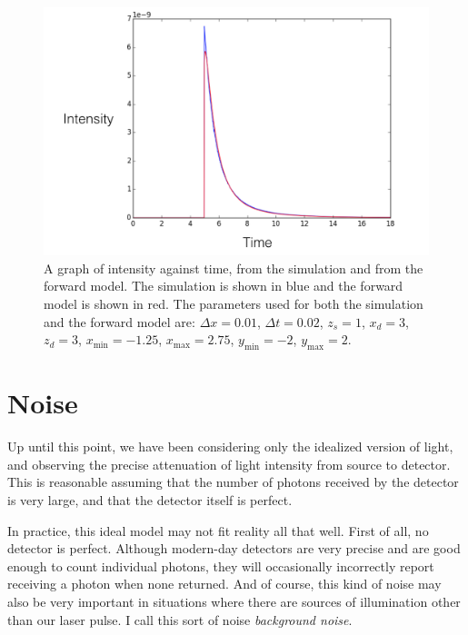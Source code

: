 \documentclass[11pt]{article}
\begin{document}
\begin{figure}
\begin{center}
\centering
\includegraphics[scale=0.5]{figs/simresult.png}
\caption{A graph of intensity against time, from the simulation and from the forward model. The simulation is shown in blue and the forward model is shown in red. The parameters used for both the simulation and the forward model are: $\Delta x = 0.01$, $\Delta t = 0.02$, $z_s = 1$, $x_d = 3$, $z_d = 3$, $x_{\mathrm{min}} = -1.25$, $x_\mathrm{max} = 2.75$, $y_{\mathrm{min}} = -2$, $y_{\mathrm{max}} = 2$. \label{fig:simresult}}
\end{center}
\end{figure}

\section{Noise}

Up until this point, we have been considering only the idealized version of light, and observing the precise attenuation of light intensity from source to detector. This is reasonable assuming that the number of photons received by the detector is very large, and that the detector itself is perfect.

In practice, this ideal model may not fit reality all that well. First of all, no detector is perfect. Although modern-day detectors are very precise and are good enough to count individual photons, they will occasionally incorrectly report receiving a photon when none returned. And of course, this kind of noise may also be very important in situations where there are sources of illumination other than our laser pulse. I call this sort of noise \emph{background noise}.
\end{document}
